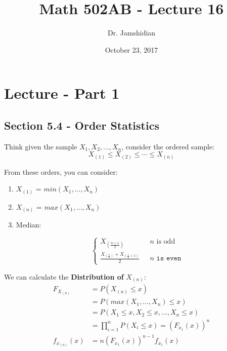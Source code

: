 \documentclass{article}
\title{Math 502AB - Lecture 16}
\author{Dr. Jamshidian}
\date{October 23, 2017}
\begin{document}
\maketitle

\section{Lecture - Part 1}

\subsection{Section 5.4 - Order Statistics}

Think given the sample $X_1, X_2,...,X_n$, consider the ordered sample:
\begin{equation*}
    X_{(1)} \leq X_{(2)} \leq \cdots \leq X_{(n)}
\end{equation*}

\noindent From these orders, you can consider:

\begin{enumerate}
    \item $X_{(1)}$ = $min(X_1,...,X_n)$
    \item $X_{(n)}$ = $max(X_1,...,X_n)$
    \item Median: 
    
    \begin{equation*}
        \begin{cases}
            X_{\left(\frac{n+1}{2}\right)} & \text{ $n$ is odd}\\
            \frac{X_{\left(\frac{n}{2}\right)} + X_{\left(\frac{n}{2} + 1\right)}}{2} & \texttt{ $n$ is even}
        \end{cases}
    \end{equation*}
\end{enumerate}

We can calculate the \textbf{Distribution of} $X_{(n)}$:
\begin{equation*}
    \begin{split}
        F_{X_{(n)}} &= P\left(X_{(n)} \leq x \right)\\
                    &= P\left( max(X_1,...,X_n) \leq x \right)\\
                    &= P\left( X_1 \leq x, X_2 \leq x,...,X_n \leq x\right)\\
                    &= \prod_{i=1}^n P(X_i \leq x) = \left(F_{x_1}(x) \right)^n\\
        f_{x_{(n)}}(x) &= n \left(F_{x_1}(x) \right)^{n-1} f_{x_1}(x)
    \end{split}
\end{equation*}
\end{document}
